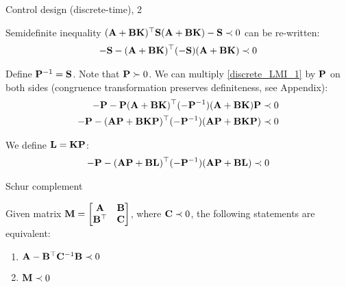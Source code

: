 \documentclass{beamer}
\begin{document}
\begin{frame}{Control design (discrete-time), 2}
	\begin{flushleft}
		
		Semidefinite inequality $(\mathbf{A} + \mathbf{B}\mathbf{K})^\top \mathbf{S} (\mathbf{A} + \mathbf{B}\mathbf{K}) - \mathbf{S} \prec 0$ can be re-written:
		\begin{align}
			\label{discrete_LMI_1}
			-\mathbf{S} - (\mathbf{A} + \mathbf{B}\mathbf{K})^\top (-\mathbf{S}) (\mathbf{A} + \mathbf{B}\mathbf{K})  \prec 0
		\end{align}
		
		Define $\mathbf{P}^{-1} = \mathbf{S}$. Note that $\mathbf{P} \succ 0$. We can  multiply \eqref{discrete_LMI_1} by $\mathbf{P}$ on both sides (congruence transformation preserves definiteness, see Appendix):
		\begin{align}
			-\mathbf{P} - \mathbf{P}(\mathbf{A} + \mathbf{B}\mathbf{K})^\top (-\mathbf{P}^{-1}) (\mathbf{A} + \mathbf{B}\mathbf{K})\mathbf{P}  \prec 0
			\\
			-\mathbf{P} - (\mathbf{A}\mathbf{P} + \mathbf{B}\mathbf{K}\mathbf{P})^\top (-\mathbf{P}^{-1}) (\mathbf{A}\mathbf{P} + \mathbf{B}\mathbf{K}\mathbf{P})  \prec 0
		\end{align}
	
		We define $\mathbf{L} = \mathbf{K}\mathbf{P}$:
		\begin{align}
			-\mathbf{P} - (\mathbf{A}\mathbf{P} + \mathbf{B}\mathbf{L})^\top (-\mathbf{P}^{-1}) (\mathbf{A}\mathbf{P} + \mathbf{B}\mathbf{L})  \prec 0
		\end{align}
		
	\end{flushleft}
\end{frame}



\begin{frame}{Schur complement}
	\begin{flushleft}
		
		\begin{theorem}
			Given matrix $\mathbf{M} = \begin{bmatrix}
				\mathbf{A} & \mathbf{B} \\
				\mathbf{B}^\top & \mathbf{C}
			\end{bmatrix}$, where $\mathbf{C} \prec 0$, 
			the following statements are equivalent:
			\begin{enumerate}
				\item $\mathbf{A} - \mathbf{B}^\top \mathbf{C}^{-1}\mathbf{B} \prec 0$
				\item $\mathbf{M} \prec 0$
			\end{enumerate}
		\end{theorem}
		
		
		
	\end{flushleft}
\end{frame}
\end{document}
